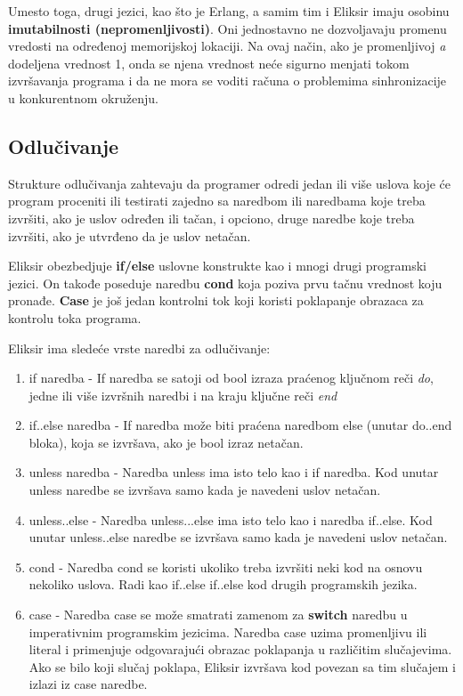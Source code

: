 \documentclass[12pt,oneside]{memoir}
\begin{document}
Umesto toga, drugi jezici, kao što je Erlang, a samim tim i Eliksir imaju osobinu \textbf{imutabilnosti (nepromenljivosti)}. Oni jednostavno ne dozvoljavaju promenu vredosti na određenoj memorijskoj lokaciji. Na ovaj način, ako je promenljivoj \textit{a} dodeljena vrednost 1, onda se njena vrednost neće sigurno menjati tokom izvršavanja programa i da ne mora se voditi računa o problemima sinhronizacije u konkurentnom okruženju.

\newpage

\subsection{Odlučivanje}

Strukture odlučivanja zahtevaju da programer odredi jedan ili više uslova koje će program proceniti ili testirati zajedno sa naredbom ili naredbama koje treba izvršiti, ako je uslov određen ili tačan, i opciono, druge naredbe koje treba izvršiti, ako je utvrđeno da je uslov netačan.

Eliksir obezbedjuje \textbf{if/else} uslovne konstrukte kao i mnogi drugi programski jezici. On takođe poseduje naredbu \textbf{cond} koja poziva prvu tačnu vrednost koju pronađe. \textbf{Case} je još jedan kontrolni tok koji koristi poklapanje obrazaca za kontrolu toka programa.

Eliksir ima sledeće vrste naredbi za odlučivanje:

\begin{enumerate}
    \item{if naredba - If naredba se satoji od bool izraza praćenog ključnom reči \textit{do}, jedne ili više izvršnih naredbi i na kraju ključne reči \textit{end}}
    \item{if..else naredba - If naredba može biti praćena naredbom else (unutar do..end bloka), koja se izvršava, ako je bool izraz netačan.}
    \item{unless naredba - Naredba unless ima isto telo kao i if naredba. Kod unutar unless naredbe se izvršava samo kada je navedeni uslov netačan.}
    \item{unless..else - Naredba unless...else ima isto telo kao i naredba if..else. Kod unutar unless..else naredbe se izvršava samo kada je navedeni uslov netačan.}
    \item{cond - Naredba cond se koristi ukoliko treba izvršiti neki kod na osnovu nekoliko uslova. Radi kao if..else if..else kod drugih programskih jezika.}
    \item{case - Naredba case  se može smatrati zamenom za \textbf{switch} naredbu u imperativnim programskim jezicima. Naredba case uzima promenljivu ili literal i primenjuje odgovarajući obrazac poklapanja u različitim slučajevima. Ako se bilo koji slučaj poklapa, Eliksir izvršava kod povezan sa tim slučajem i izlazi iz case naredbe.}
\end{enumerate}
\end{document}
